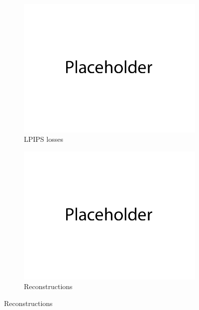 \documentclass{article}
\begin{document}
\begin{figure}[H]
\begin{subfigure}{0.45\textwidth}
    \end{subfigure}
    \\
    \begin{subfigure}{0.4\textwidth}
        \centering
        \includegraphics[width=\textwidth]{figures/q3b_lpips_losses.png}
        \caption{LPIPS losses}
    \end{subfigure}
    \begin{subfigure}{0.6\textwidth}
        \centering
        \includegraphics[width=\textwidth]{figures/q3b_reconstructions.png}
        \caption{Reconstructions}
    \end{subfigure}
\end{figure}
\end{document}
